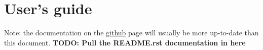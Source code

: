 \chapter{User's guide} 
\label{chap:user} 

Note: the documentation on the \href{github.com/malaria-atlas-project/generic-mbg}{github} page will usually be more up-to-date than this document. 
\textbf{TODO: Pull the README.rst documentation in here}